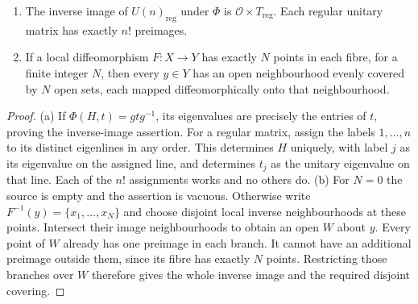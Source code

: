 \begin{lemma}\label{lem:sheets}
\begin{enumerate}
\item[(a)] The inverse image of $U(n)_{\mathrm{reg}}$ under $\Phi$ is
$\mathcal O\times T_{\mathrm{reg}}$. Each regular unitary matrix has
exactly $n!$ preimages.
\item[(b)] If a local diffeomorphism $F:X\to Y$ has exactly $N$ points
in each fibre, for a finite integer $N$, then every $y\in Y$ has an
open neighbourhood evenly covered by $N$ open sets, each mapped
diffeomorphically onto that neighbourhood.
\end{enumerate}
\end{lemma}
\begin{proof}
(a) If $\Phi(H,t)=gtg^{-1}$, its eigenvalues are precisely the entries
of $t$, proving the inverse-image assertion.
For a regular matrix, assign the labels $1,\ldots,n$ to its distinct
eigenlines in any order. This determines $H$ uniquely, with label $j$
as its eigenvalue on the assigned line, and determines $t_j$ as the
unitary eigenvalue on that line. Each of the $n!$ assignments works and
no others do.
(b) For $N=0$ the source is empty and the assertion is vacuous.
Otherwise write $F^{-1}(y)=\{x_1,\ldots,x_N\}$ and choose disjoint
local inverse neighbourhoods at these points.
Intersect their image neighbourhoods to obtain an open $W$ about $y$.
Every point of $W$ already has one preimage in each branch.
It cannot have an additional preimage outside them, since its fibre has
exactly $N$ points. Restricting those branches over $W$ therefore gives
the whole inverse image and the required disjoint covering.
\end{proof}

